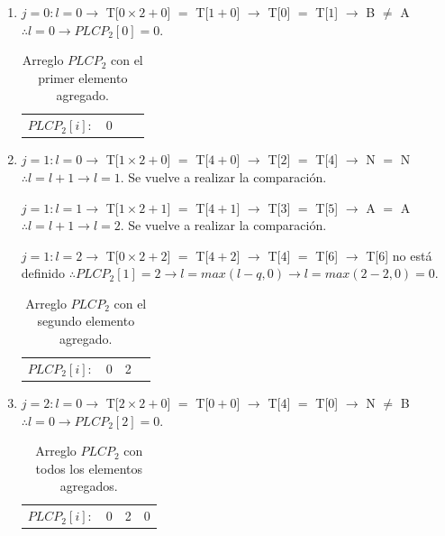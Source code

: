 \begin{enumerate}

\item $j=0: l=0 \rightarrow$ T[$0 \times 2+0$] $=$ T[$1+0$] $\rightarrow$ T[$0$] $=$ T[$1$] $\rightarrow$ B $\neq$ A $\therefore l=0 \rightarrow PLCP_{2}[0] = 0$.

\begin{table}[!htb]
\centering
\begin{tabular}{c|c|c|c|}
\cline{2-4}
$PLCP_{2}[i]:$ & 0 &  & \\ \cline{2-4}
\end{tabular}
\caption{Arreglo $PLCP_{2}$ con el primer elemento agregado.}
\end{table}

\item $j=1: l=0 \rightarrow$ T[$1 \times 2+0$] $=$ T[$4+0$] $\rightarrow$ T[$2$] $=$ T[$4$] $\rightarrow$ N $=$ N $\therefore l=l+1 \rightarrow l=1$. Se vuelve a realizar la comparación.

$j=1: l=1 \rightarrow$ T[$1 \times 2+1$] $=$ T[$4+1$] $\rightarrow$ T[$3$] $=$ T[$5$] $\rightarrow$ A $=$ A $\therefore l=l+1 \rightarrow l=2$. Se vuelve a realizar la comparación.

$j=1: l=2 \rightarrow$ T[$0 \times 2+2$] $=$ T[$4+2$] $\rightarrow$ T[$4$] $=$ T[$6$] $\rightarrow$ T[$6$] no está definido $\therefore PLCP_{2}[1] = 2 \rightarrow l=max(l-q,0) \rightarrow l=max(2-2,0) = 0$.


\begin{table}[!htb]
\centering
\begin{tabular}{c|c|c|c|}
\cline{2-4}
$PLCP_{2}[i]:$ & 0 & 2 & \\ \cline{2-4}
\end{tabular}
\caption{Arreglo $PLCP_{2}$ con el segundo elemento agregado.}
\end{table}

\item $j=2: l=0 \rightarrow$ T[$2 \times 2+0$] $=$ T[$0+0$] $\rightarrow$ T[$4$] $=$ T[$0$] $\rightarrow$ N $\neq$ B $\therefore l=0 \rightarrow PLCP_{2}[2] = 0$.

\begin{table}[!htb]
\centering
\begin{tabular}{c|c|c|c|}
\cline{2-4}
$PLCP_{2}[i]:$ & 0 & 2 & 0\\ \cline{2-4}
\end{tabular}
\caption{Arreglo $PLCP_{2}$ con todos los elementos agregados.}
\end{table}

\end{enumerate}

